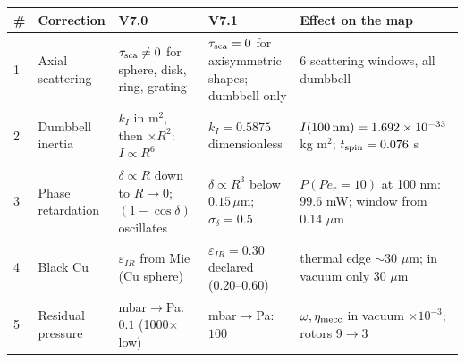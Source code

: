 \begin{tabular}{@{}p{0.35cm}p{2.8cm}p{4.1cm}p{4.2cm}p{4.2cm}@{}}
\hline
\# & Correction & V7.0 & V7.1 & Effect on the map \\
\hline
1 & Axial scattering &
  $\tau_{\rm sca}\neq0$ for sphere, disk, ring, grating &
  $\tau_{\rm sca}=0$ for axisymmetric shapes; dumbbell only &
  6 scattering windows, all dumbbell \\
\hline
2 & Dumbbell inertia &
  $k_I$ in m$^2$, then $\times R^2$: $I\propto R^6$ &
  $k_I=0.5875$ dimensionless &
  $I(100\,{\rm nm})=1.692\times10^{-33}$ kg m$^2$; $t_{\rm spin}=0.076$ s \\
\hline
3 & Phase retardation &
  $\delta\propto R$ down to $R\to0$; $(1-\cos\delta)$ oscillates &
  $\delta\propto R^3$ below $0.15\,\mu$m; $\sigma_\delta=0.5$ &
  $P(Pe_r=10)$ at 100 nm: 99.6 mW; window from 0.14 $\mu$m \\
\hline
4 & Black Cu &
  $\varepsilon_{IR}$ from Mie (Cu sphere) &
  $\varepsilon_{IR}=0.30$ declared (0.20--0.60) &
  thermal edge $\sim$30 $\mu$m; in vacuum only 30 $\mu$m \\
\hline
5 & Residual pressure &
  mbar$\to$Pa: $0.1$ (1000$\times$ low) &
  mbar$\to$Pa: $100$ &
  $\omega,\eta_{\rm mecc}$ in vacuum $\times10^{-3}$; rotors 9$\to$3 \\
\hline
\end{tabular}
